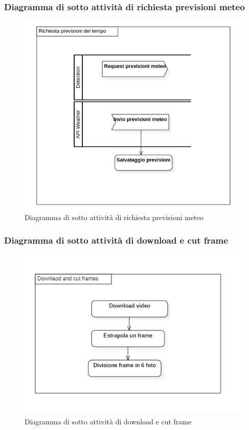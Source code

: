 \subsubsection{Diagramma di sotto attività di richiesta previsioni meteo}\label{DiagrammaSottoAttivitaRichiestaPrevisioniMeteo}
\begin{center}
	\begin{figure}[H]
		\centering\includegraphics[scale=0.8]
    {../immagini/diag_PB/previsioni_del_tempo.png}
		\caption{Diagramma di sotto attività di richiesta previsioni meteo}
	\end{figure}
\end{center}

\subsubsection{Diagramma di sotto attività di download e cut frame}\label{DiagrammaSottoAttivitaDownloadECutFrameVideo}
\begin{center}
	\begin{figure}[H]
		\centering\includegraphics[scale=0.8]
    {../immagini/diag_PB/download_e_cut_frames.png}
		\caption{Diagramma di sotto attività di download e cut frame}
	\end{figure}
\end{center}

